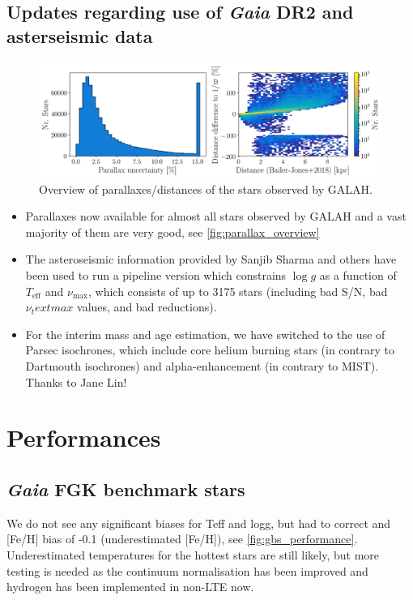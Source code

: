 \documentclass[a4paper,11pt,english]{article}
\begin{document}
\subsection{Updates regarding use of \textit{Gaia} DR2 and asterseismic data}

\begin{figure}[!ht]
\centering
\includegraphics[width=\textwidth]{../../input/figures/parallax_uncertainties.png}
\caption{Overview of parallaxes/distances of the stars observed by GALAH.}
\label{fig:parallax_overview}
\end{figure}

\begin{itemize}
\item Parallaxes now available for almost all stars observed by GALAH and a vast majority of them are very good, see \autoref{fig:parallax_overview}
\item The asteroseismic information provided by Sanjib Sharma and others have been used to run a pipeline version which constrains $\log g$ as a function of $T_\text{eff}$ and $\nu_\text{max}$, which consists of up to 3175 stars (including bad S/N, bad $\nu_text{max}$ values, and bad reductions).
\item For the interim mass and age estimation, we have switched to the use of Parsec isochrones, which include core helium burning stars (in contrary to Dartmouth isochrones) and alpha-enhancement (in contrary to MIST). Thanks to Jane Lin!
\end{itemize}

\section{Performances}

\subsection{\textit{Gaia} FGK benchmark stars}

We do not see any significant biases for Teff and logg, but had to correct and [Fe/H] bias of -0.1 (underestimated [Fe/H]), see \autoref{fig:gbs_performance}. Underestimated temperatures for the hottest stars are still likely, but more testing is needed as the continuum normalisation has been improved and hydrogen has been implemented in non-LTE now.
\end{document}
